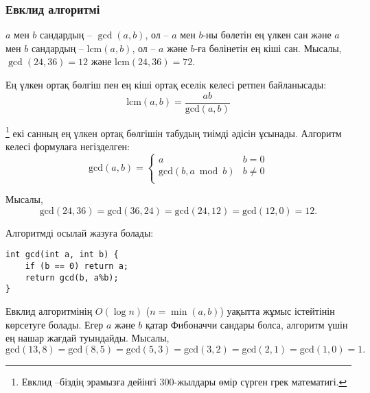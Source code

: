 \subsubsection{Евклид алгоритмі}


$a$ мен $b$ сандардың  -- $\gcd(a,b)$, ол --
$a$ мен $b$-ны бөлетін ең үлкен сан және
$a$ мен $b$ сандардың  --
$\textrm{lcm}(a,b)$, ол --
$a$ және $b$-ға бөлінетін ең кіші сан.
Мысалы, $\gcd(24,36)=12$ және
$\textrm{lcm}(24,36)=72$.

Ең үлкен ортақ бөлгіш пен ең кіші ортақ еселік келесі ретпен байланысады:
\[\textrm{lcm}(a,b)=\frac{ab}{\textrm{gcd}(a,b)}\]

\footnote{Евклид --біздің эрамызға дейінгі 300-жылдары өмір сүрген грек математигі.} екі санның ең үлкен ортақ бөлгішін табудың тиімді әдісін ұсынады.
Алгоритм келесі формулаға негізделген:
\begin{equation*}
    \textrm{gcd}(a,b) = \begin{cases}
               a        & b = 0\\
               \textrm{gcd}(b,a \bmod b) & b \neq 0\\
           \end{cases}
\end{equation*}

Мысалы,
\[\textrm{gcd}(24,36) = \textrm{gcd}(36,24)
= \textrm{gcd}(24,12) = \textrm{gcd}(12,0)=12.\]

Алгоритмді осылай жазуға болады:
\begin{lstlisting}
int gcd(int a, int b) {
    if (b == 0) return a;
    return gcd(b, a%b);
}
\end{lstlisting}

Евклид алгоритмінің $O(\log n)$ ($n=\min(a,b)$) уақытта жұмыс істейтінін
көрсетуге болады.
Егер $a$ және $b$ қатар Фибоначчи сандары болса, алгоритм үшін ең нашар жағдай туындайды. Мысалы,
\[\textrm{gcd}(13,8)=\textrm{gcd}(8,5)
=\textrm{gcd}(5,3)=\textrm{gcd}(3,2)=\textrm{gcd}(2,1)=\textrm{gcd}(1,0)=1.\]

